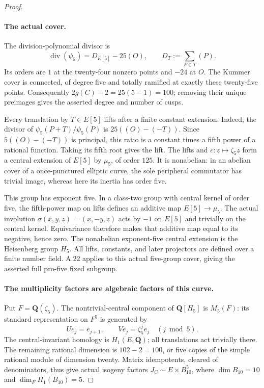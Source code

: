 \begin{proof}
\paragraph{The actual cover.}
The division-polynomial divisor is
\[
 \operatorname{div}(\psi _5)=D_{E[5]}-25(O),
 \qquad D_T:=\sum_{P\in T}(P).                     \tag{A.54.3}
\]
Its orders are \(1\) at the twenty-four nonzero points and \(-24\)
at \(O\). The Kummer cover is connected, of degree five and totally
ramified at exactly these twenty-five points. Consequently
\(2g(C)-2=25(5-1)=100\); removing their unique preimages gives
the asserted degree and number of cusps.

Every translation by \(T\in E[5]\) lifts after a finite constant
extension. Indeed, the divisor of \(\psi _5(P+T)/\psi _5(P)\) is
\(25((O)-(-T))\). Since \(5((O)-(-T))\) is principal, this
ratio is a constant times a fifth power of a rational function.
Taking its fifth root gives the lift. The lifts and
\(c:z\mapsto\zeta _5z\) form a central extension of \(E[5]\)
by \(\mu _5\), of order \(125\). It is nonabelian: in an abelian
cover of a once-punctured elliptic curve, the sole peripheral
commutator has trivial image, whereas here its inertia has order five.

This group has exponent five. In a class-two group with central
kernel of order five, the fifth-power map on lifts defines an additive
map \(E[5]\to\mu _5\). The actual involution
\(\sigma(x,y,z)=(x,-y,z)\) acts by \(-1\) on \(E[5]\) and
trivially on the central kernel. Equivariance therefore makes that
additive map equal to its negative, hence zero. The nonabelian
exponent-five central extension is the Heisenberg group \(H_5\).
All lifts, constants, and later projectors are defined over a finite
number field. A.22 applies to this actual five-group cover, giving
the asserted full pro-five fixed subgroup.

\paragraph{The multiplicity factors are algebraic factors of this curve.}
Put \(F=\mathbf Q(\zeta _5)\). The nontrivial-central component
of \(\mathbf Q[H_5]\) is \(M_5(F)\): its standard representation
on \(F^5\) is generated by
\[
 Ue_j=e_{j+1},\qquad Ve_j=\zeta _5^j e_j
                         \quad(j\bmod5).
\]
The central-invariant homology is \(H_1(E,\mathbf Q)\); all
translations act trivially there. The remaining rational dimension
is \(102-2=100\), or five copies of the simple rational module
of dimension twenty. Matrix idempotents, cleared of denominators,
thus give actual isogeny factors \(J_C\sim E\times B_{10}^5\),
where \(\dim B_{10}=10\) and \(\dim_F H_1(B_{10})=5\).


\end{proof}
